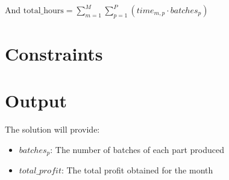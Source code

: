 \documentclass{article}
\begin{document}
And \( \text{total\_hours} = \sum_{m=1}^{M} \sum_{p=1}^{P} (time_{m,p} \cdot batches_{p}) \)

\section*{Constraints}
\]

\section*{Output}
The solution will provide:
\begin{itemize}
    \item \( batches_{p} \): The number of batches of each part produced
    \item \( total\_profit \): The total profit obtained for the month
\end{itemize}
\end{document}
